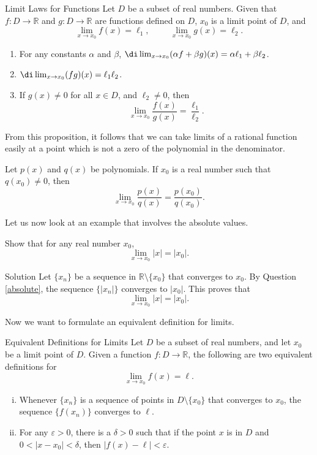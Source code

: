  \begin{proposition}[label=23020813]{Limit Laws for Functions}
Let $D$ be a subset of real numbers. Given that $f:D\rightarrow\mathbb{R}$ and $g:D\rightarrow\mathbb{R}$ are functions defined on $D$,   $x_0$ is a limit point of $D$,  and
\[\lim_{x\rightarrow x_0}f(x)=\ell_1,\hspace{1cm}\lim_{x\rightarrow x_0}g(x)=\ell_2.\]
\begin{enumerate}[1.]
\item
For any constants $\alpha$ and $\beta$, $\di \lim_{x\rightarrow x_0}(\alpha f+\beta g)(x)=\alpha\ell_1+\beta \ell_2$.
\item $\di \lim_{x\rightarrow x_0}(  f  g)(x)= \ell_1  \ell_2$.
\item If  $g(x)\neq 0$ for all $x\in D$, and $\ell_2\neq 0$, then
\[\lim_{x\rightarrow x_0}\frac{f(x)}{g(x)}=\frac{\ell_1}{\ell_2}.\]
\end{enumerate}
 \end{proposition}
 
 From this proposition, it follows that we can take limits of a rational function easily at a point which is not a zero of the polynomial in the denominator.
 \begin{proposition}[label=23020807]{}
 Let $p(x)$ and $q(x)$ be polynomials. If $x_0$ is a real number such that
 $q(x_0)\neq 0$, then
 \[\lim_{x\rightarrow x_0}\frac{p(x)}{q(x)}=\frac{p(x_0)}{q(x_0)}.\]
 \end{proposition}
 
 
 Let us now look at an example that involves the absolute values.
 \begin{example}[label=23020803]{}
 Show that for any real number $x_0$, 
 \[\lim_{x\rightarrow x_0}|x|=|x_0|.\]

\end{example}
\begin{solution}{Solution}
Let $\{x_n\}$ be a sequence in $\mathbb{R}\setminus\{x_0\}$ that converges to $x_0$. By Question \ref{absolute}, the sequence $\{|x_n|\}$ converges to $|x_0|$. This proves that
\[\lim_{x\rightarrow x_0}|x|=|x_0|.\]
\end{solution}

 Now we want to formulate an equivalent definition for limits.
 \begin{theorem}[label=23020801]{Equivalent Definitions for Limits}
  Let $D$ be a subset of real numbers, and let $x_0$ be a limit point of $D$. Given a function $f:D\rightarrow \mathbb{R}$, 
  the following are two equivalent definitions for 
  \[\lim_{x\rightarrow x_0}f(x)=\ell.\]  
  \begin{enumerate}[(i)]
  \item 
  Whenever $\{x_n\}$ is a sequence of points in $D\setminus\{x_0\}$ that converges to $x_0$, the sequence $\{f(x_n)\}$ converges to $\ell$. 
  \item For any $\varepsilon>0$, there is a $\delta>0$ such that if the point $x$ is in $D$ and $0<|x-x_0|<\delta$, then $|f(x)-\ell|<\varepsilon$.
  \end{enumerate} 
 \end{theorem}
 
